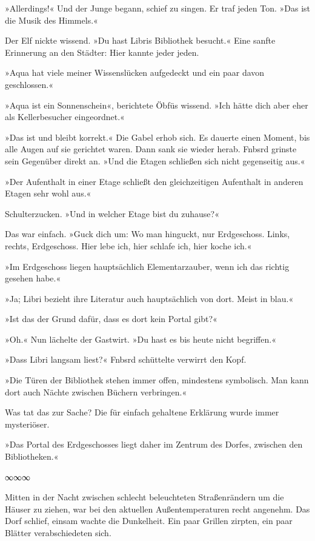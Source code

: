 »Allerdings!« Und der Junge begann, schief zu singen. Er traf jeden Ton. »Das ist die Musik des Himmels.«

Der Elf nickte wissend. »Du hast Libris Bibliothek besucht.« Eine sanfte Erinnerung an den Städter: Hier kannte jeder jeden.

»Aqua hat viele meiner Wissenslücken aufgedeckt und ein paar davon geschlossen.«

»Aqua ist ein Sonnenschein«, berichtete Öbfüs wissend. »Ich hätte dich aber eher als Kellerbesucher eingeordnet.«

»Das ist und bleibt korrekt.« Die Gabel erhob sich. Es dauerte einen Moment, bis alle Augen auf sie gerichtet waren. Dann sank sie wieder herab. Fnbsrd grinste sein Gegenüber direkt an. »Und die Etagen schließen sich nicht gegenseitig aus.«

»Der Aufenthalt in einer Etage schließt den gleichzeitigen Aufenthalt in anderen Etagen sehr wohl aus.«

Schulterzucken. »Und in welcher Etage bist du zuhause?«

Das war einfach. »Guck dich um: Wo man hinguckt, nur Erdgeschoss. Links, rechts, Erdgeschoss. Hier lebe ich, hier schlafe ich, hier koche ich.«

»Im Erdgeschoss liegen hauptsächlich Elementarzauber, wenn ich das richtig gesehen habe.«

»Ja; Libri bezieht ihre Literatur auch hauptsächlich von dort. Meist in blau.«

»Ist das der Grund dafür, dass es dort kein Portal gibt?«

»Oh.« Nun lächelte der Gastwirt. »Du hast es bis heute nicht begriffen.«

»Dass Libri langsam liest?« Fnbsrd schüttelte verwirrt den Kopf.

»Die Türen der Bibliothek stehen immer offen, mindestens symbolisch. Man kann dort auch Nächte zwischen Büchern verbringen.«

Was tat das zur Sache? Die für einfach gehaltene Erklärung wurde immer mysteriöser.

»Das Portal des Erdgeschosses liegt daher im Zentrum des Dorfes, zwischen den Bibliotheken.«

\begin{center}
∞∞∞
\end{center}

Mitten in der Nacht zwischen schlecht beleuchteten Straßenrändern um die Häuser zu ziehen, war bei den aktuellen Außentemperaturen recht angenehm. Das Dorf schlief, einsam wachte die Dunkelheit. Ein paar Grillen zirpten, ein paar Blätter verabschiedeten sich.

